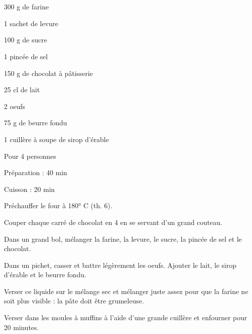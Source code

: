 \section[\normalsize{Muffins aux pépites de chocolat (façon Claire T.)}]{}

\begin{ingredients}
\item 300 g de farine
\item 1 sachet de levure
\item 100 g de sucre
\item 1 pinc\'ee de sel
\item 150 g de chocolat \`a p\^atisserie
\item 25 cl de lait
\item 2 oeufs
\item 75 g de beurre fondu
\item 1 cuill\`ere \`a soupe de sirop d'\'erable
\end{ingredients}
\begin{infos}
\item Pour 4 personnes
\item Préparation : 40 min
\item Cuisson : 20 min
\end{infos}
\begin{etapes}
\item Pr\'echauffer le four \`a 180° C (th. 6).
\item Couper chaque carr\'e de chocolat en 4 en se servant d'un grand couteau.
\item Dans un grand bol, m\'elanger la farine, la levure, le sucre, la pinc\'ee de sel et le chocolat.
\item Dans un pichet, casser et battre l\'eg\`erement les oeufs. Ajouter le lait, le sirop d'\'erable et le beurre fondu.
\item Verser ce liquide sur le m\'elange sec et m\'elanger juste assez pour que la farine ne soit plus visible : la p\^ate doit \^etre grumeleuse.
\item Verser dans les moules \`a muffins \`a l'aide d'une grande cuill\`ere et enfourner pour 20 minutes.
\end{etapes}
\begin{conseils}
\end{conseils}
